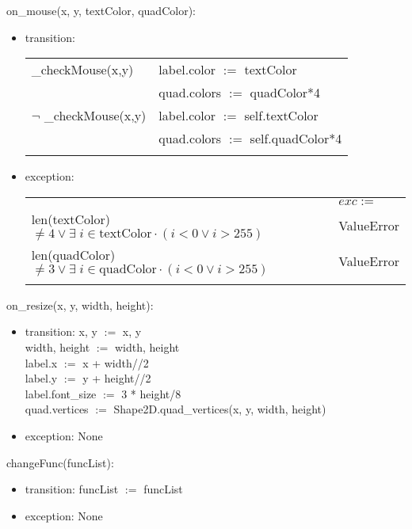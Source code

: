 \documentclass{article}
\begin{document}
\noindent on\_mouse(x, y, textColor, quadColor):
\begin{itemize}
\item transition: 

\begin{tabular}{|l|l|}
\hhline{|-|-|}
\_checkMouse(x,y) & label.color $:=$ textColor\\
 &quad.colors $:=$ quadColor*4\\
\hhline{|-|-|}
$\neg$ \_checkMouse(x,y) & label.color $:=$ self.textColor\\
 &quad.colors $:=$ self.quadColor*4\\
\hhline{|-|-|}
\end{tabular}

\item exception: 

\begin{tabular}{|l|l|}
\hhline{~|-|}
\multicolumn{1}{r|}{} & \multicolumn{1}{l|}{$exc :=$}\\
\hhline{|-|-|}
len(textColor) $\neq 4 \lor \exists \; i \in \text{textColor} \cdot (i < 0 \lor i > 255)$ & ValueError \\
\hhline{|-|-|}
len(quadColor) $\neq 3 \lor \exists \; i \in \text{quadColor} \cdot (i < 0 \lor i > 255)$ & ValueError \\
\hhline{|-|-|}
\end{tabular}
\end{itemize}\vspace{6mm}

\noindent on\_resize(x, y, width, height):
\begin{itemize}
\item transition: x, y $:=$ x, y\\
    width, height $:=$ width, height\\
    label.x $:=$ x + width//2\\
    label.y $:=$ y + height//2\\
    label.font\_size $:=$ 3 * height/8\\
    quad.vertices $:=$ Shape2D.quad\_vertices(x, y, width, height)
    
\item exception: None
\end{itemize}\vspace{6mm}

\noindent changeFunc(funcList):
\begin{itemize}
\item transition: funcList $:=$ funcList
\item exception: None
\end{itemize}
\end{document}
